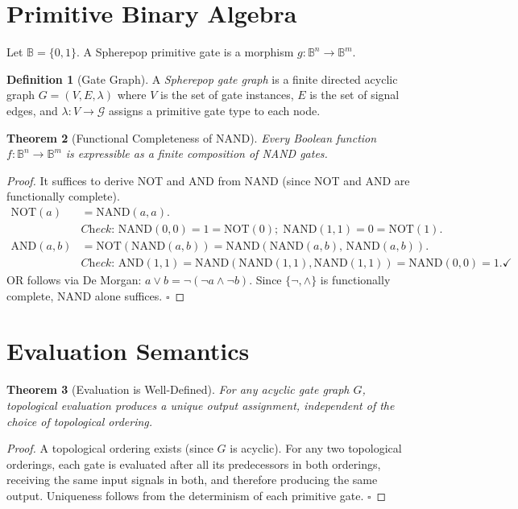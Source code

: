 \documentclass[11pt,a4paper,openany]{book}
\theoremstyle{plain}
\newtheorem{theorem}{Theorem}[chapter]
\theoremstyle{definition}
\newtheorem{definition}[theorem]{Definition}
\theoremstyle{remark}
\begin{document}
\section{Primitive Binary Algebra}

Let $\mathbb{B} = \{0, 1\}$. A Spherepop primitive gate is a morphism
$g : \mathbb{B}^n \to \mathbb{B}^m$.

\begin{definition}[Gate Graph]
  A \emph{Spherepop gate graph} is a finite directed acyclic graph
  $G = (V, E, \lambda)$ where $V$ is the set of gate instances,
  $E$ is the set of signal edges, and $\lambda : V \to \mathcal{G}$
  assigns a primitive gate type to each node.
\end{definition}

\begin{theorem}[Functional Completeness of NAND]
  Every Boolean function $f : \mathbb{B}^n \to \mathbb{B}^m$ is
  expressible as a finite composition of NAND gates.
\end{theorem}
\begin{proof}
  It suffices to derive NOT and AND from NAND (since NOT and AND are
  functionally complete).
  \begin{align*}
    \mathrm{NOT}(a) &= \mathrm{NAND}(a, a). \\
    &\textit{Check: } \mathrm{NAND}(0,0)=1=\mathrm{NOT}(0);\;
      \mathrm{NAND}(1,1)=0=\mathrm{NOT}(1). \\
    \mathrm{AND}(a,b) &= \mathrm{NOT}(\mathrm{NAND}(a,b))
                        = \mathrm{NAND}(\mathrm{NAND}(a,b),\,\mathrm{NAND}(a,b)). \\
    &\textit{Check: } \mathrm{AND}(1,1)=\mathrm{NAND}(\mathrm{NAND}(1,1),\mathrm{NAND}(1,1))
      =\mathrm{NAND}(0,0)=1. \checkmark
  \end{align*}
  OR follows via De Morgan: $a \vee b = \neg(\neg a \wedge \neg b)$.
  Since $\{\neg, \wedge\}$ is functionally complete, NAND alone suffices.
  $\square$
\end{proof}

\section{Evaluation Semantics}

\begin{theorem}[Evaluation is Well-Defined]
  For any acyclic gate graph $G$, topological evaluation produces a
  unique output assignment, independent of the choice of topological
  ordering.
\end{theorem}
\begin{proof}
  A topological ordering exists (since $G$ is acyclic). For any two
  topological orderings, each gate is evaluated after all its predecessors
  in both orderings, receiving the same input signals in both, and
  therefore producing the same output. Uniqueness follows from the
  determinism of each primitive gate. $\square$
\end{proof}
\end{document}
